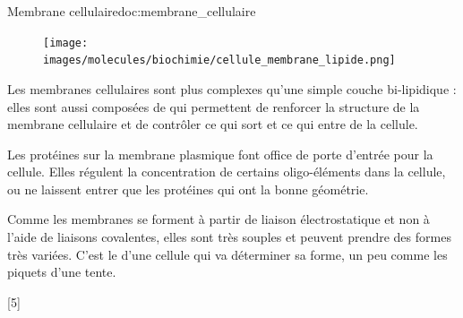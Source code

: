\begin{doc}{Membrane cellulaire}{doc:membrane_cellulaire}
  \begin{figure}
    \centering
    \vspace*{-36pt}
    \texttt{[image: images/molecules/biochimie/cellule\_membrane\_lipide.png]}
  \end{figure}
  Les membranes cellulaires sont plus complexes qu'une simple couche bi-lipidique : elles sont aussi composées de  qui permettent de renforcer la structure de la membrane cellulaire et de contrôler ce qui sort et ce qui entre de la cellule.
  \smallskip

  Les protéines sur la membrane plasmique font office de porte d'entrée pour la cellule. 
  Elles régulent la concentration de certains oligo-éléments dans la cellule, ou ne laissent entrer que les protéines qui ont la bonne géométrie.

  Comme les membranes se forment à partir de liaison électrostatique et non à l'aide de liaisons covalentes, elles sont très souples et peuvent prendre des formes très variées. 
  C'est le  d'une cellule qui va déterminer sa forme, un peu comme les piquets d'une tente.
  
  \phantom{b}
\end{doc}

[5]
